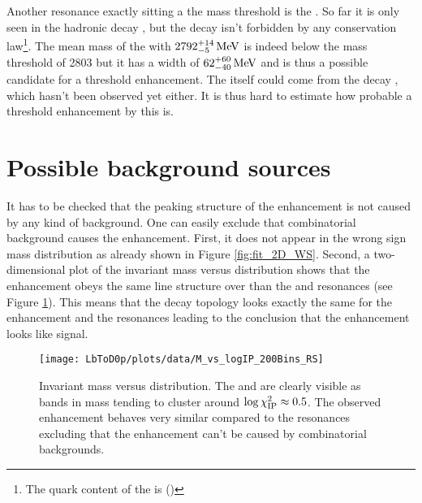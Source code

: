 Another resonance exactly sitting a the \Dz\proton mass threshold is the .
So far it is only seen in the hadronic decay , but the decay  isn't forbidden by any conservation law\footnote{The quark content of the  is (\uquark\dquark\cquark)}.
The mean mass of the  with $2792^{+14}_{-5}\mathrm{\,Me\kern -0.1em V}$ is indeed below the \Dz\proton mass threshold of 2803 \mev but it has a width of $62^{+60}_{-40}\mathrm{\,Me\kern -0.1em V}$ \cite{PDG} and is thus a possible candidate for a threshold enhancement.
The  itself could come from the decay , which hasn't been observed yet either.
It is thus hard to estimate how probable a threshold enhancement by this  is.

\section{Possible background sources}
It has to be checked that the peaking structure of the enhancement is not caused by any kind of background.
One can easily exclude that combinatorial background causes the enhancement.
First, it does not appear in the wrong sign \Dz\proton mass distribution as already shown in Figure \ref{fig:fit_2D_WS}.
Second, a two-dimensional plot of the invariant \Dz\proton mass versus \logIP distribution shows that the enhancement obeys the same line structure over \logIP than the \LcResI and \LcResII resonances (see Figure \ref{fig:plot_M_vs_logIP}).
This means that the decay topology looks exactly the same for the enhancement and the resonances leading to the conclusion that the enhancement looks like signal.
\begin{figure}[hptb]
	\centering
	\texttt{[image: LbToD0p/plots/data/M\_vs\_logIP\_200Bins\_RS]}
	\caption{Invariant \Dz\proton mass versus \logIP distribution. The \LcResI and \LcResII are clearly visible as bands in \Dz\proton mass tending to cluster around $\log \chi^2_{\text{IP}} \approx 0.5$. The observed enhancement behaves very similar compared to the resonances excluding that the enhancement can't be caused by combinatorial backgrounds.}
	\label{fig:plot_M_vs_logIP}
\end{figure}

